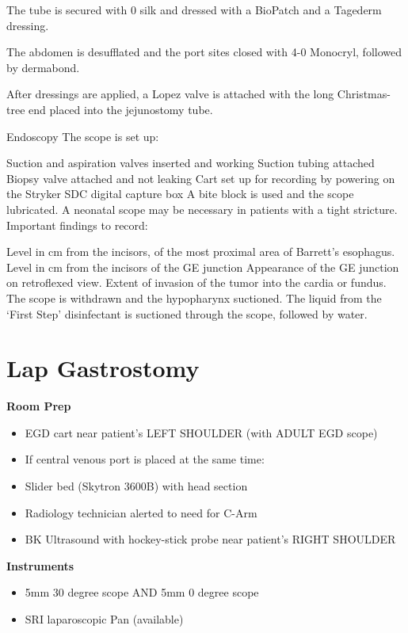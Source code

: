 \documentclass[
]{book}
\providecommand{\tightlist}{%
  \setlength{\itemsep}{0pt}\setlength{\parskip}{0pt}}
\begin{document}
The tube is secured with 0 silk and dressed with a BioPatch and a Tagederm dressing.

The abdomen is desufflated and the port sites closed with 4-0 Monocryl, followed by dermabond.

After dressings are applied, a Lopez valve is attached with the long Christmas-tree end placed into the jejunostomy tube.

Endoscopy
The scope is set up:

Suction and aspiration valves inserted and working
Suction tubing attached
Biopsy valve attached and not leaking
Cart set up for recording by powering on the Stryker SDC digital capture box
A bite block is used and the scope lubricated. A neonatal scope may be necessary in patients with a tight stricture. Important findings to record:

Level in cm from the incisors, of the most proximal area of Barrett's esophagus.
Level in cm from the incisors of the GE junction
Appearance of the GE junction on retroflexed view. Extent of invasion of the tumor into the cardia or fundus.
The scope is withdrawn and the hypopharynx suctioned. The liquid from the `First Step' disinfectant is suctioned through the scope, followed by water.

\hypertarget{lap_gastrostomy_salo}{%
\chapter{Lap Gastrostomy}\label{lap_gastrostomy_salo}}

\textbf{Room Prep}

\begin{itemize}
\tightlist
\item
  EGD cart near patient's LEFT SHOULDER (with ADULT EGD scope)
\item
  If central venous port is placed at the same time:
\item
  Slider bed (Skytron 3600B) with head section
\item
  Radiology technician alerted to need for C-Arm
\item
  BK Ultrasound with hockey-stick probe near patient's RIGHT SHOULDER
\end{itemize}

\textbf{Instruments}

\begin{itemize}
\tightlist
\item
  5mm 30 degree scope AND 5mm 0 degree scope
\item
  SRI laparoscopic Pan (available)
\end{itemize}
\end{document}
